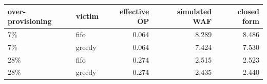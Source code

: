\begin{tabular}{llrrr}
\toprule
over-provisioning & victim & effective OP & simulated WAF & closed form \\
\midrule
7\% & fifo & 0.064 & 8.289 & 8.486 \\
7\% & greedy & 0.064 & 7.424 & 7.530 \\
28\% & fifo & 0.274 & 2.515 & 2.523 \\
28\% & greedy & 0.274 & 2.435 & 2.440 \\
\bottomrule
\end{tabular}
